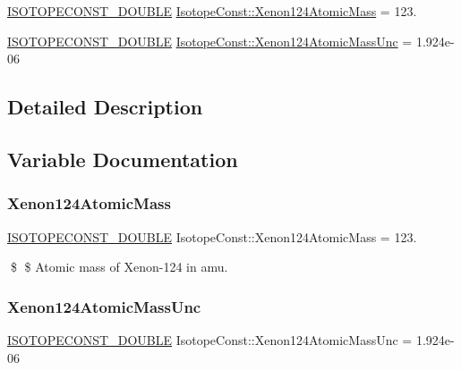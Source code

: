 \begin{DoxyCompactItemize}
\item 
\mbox{\hyperlink{group___isotope_const-_macros_ga8f45a7272ce02c0b4c65c44636ed719a}{I\+S\+O\+T\+O\+P\+E\+C\+O\+N\+S\+T\+\_\+\+D\+O\+U\+B\+LE}} \mbox{\hyperlink{group___isotope_const-_xenon-_xe124_ga80a39da60a51f7cc0e086942149d15f8}{Isotope\+Const\+::\+Xenon124\+Atomic\+Mass}} = 123.
\item 
\mbox{\hyperlink{group___isotope_const-_macros_ga8f45a7272ce02c0b4c65c44636ed719a}{I\+S\+O\+T\+O\+P\+E\+C\+O\+N\+S\+T\+\_\+\+D\+O\+U\+B\+LE}} \mbox{\hyperlink{group___isotope_const-_xenon-_xe124_gab3bc16d4e7c29286c0b51e250d065cfd}{Isotope\+Const\+::\+Xenon124\+Atomic\+Mass\+Unc}} = 1.\+924e-\/06
\end{DoxyCompactItemize}


\subsection{Detailed Description}


\subsection{Variable Documentation}
\mbox{\label{group___isotope_const-_xenon-_xe124_ga80a39da60a51f7cc0e086942149d15f8}} 
\subsubsection{\texorpdfstring{Xenon124\+Atomic\+Mass}{Xenon124AtomicMass}}
{\footnotesize\ttfamily \mbox{\hyperlink{group___isotope_const-_macros_ga8f45a7272ce02c0b4c65c44636ed719a}{I\+S\+O\+T\+O\+P\+E\+C\+O\+N\+S\+T\+\_\+\+D\+O\+U\+B\+LE}} Isotope\+Const\+::\+Xenon124\+Atomic\+Mass = 123.}

\$ \$ Atomic mass of Xenon-\/124 in amu. \mbox{\label{group___isotope_const-_xenon-_xe124_gab3bc16d4e7c29286c0b51e250d065cfd}} 
\subsubsection{\texorpdfstring{Xenon124\+Atomic\+Mass\+Unc}{Xenon124AtomicMassUnc}}
{\footnotesize\ttfamily \mbox{\hyperlink{group___isotope_const-_macros_ga8f45a7272ce02c0b4c65c44636ed719a}{I\+S\+O\+T\+O\+P\+E\+C\+O\+N\+S\+T\+\_\+\+D\+O\+U\+B\+LE}} Isotope\+Const\+::\+Xenon124\+Atomic\+Mass\+Unc = 1.\+924e-\/06}

